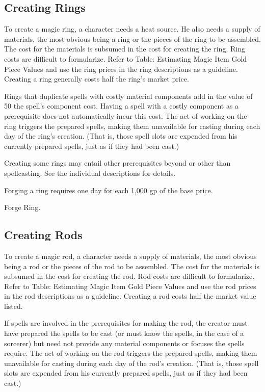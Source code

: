 \subsection{Creating Rings}

To create a magic ring, a character needs a heat source. He also needs a supply of materials, the most obvious being a ring or the pieces of the ring to be assembled. The cost for the materials is subsumed in the cost for creating the ring. Ring costs are difficult to formularize. Refer to Table: Estimating Magic Item Gold Piece Values and use the ring prices in the ring descriptions as a guideline. Creating a ring generally costs half the ring's market price.

Rings that duplicate spells with costly material components add in the value of 50 \x the spell's component cost. Having a spell with a costly component as a prerequisite does not automatically incur this cost. The act of working on the ring triggers the prepared spells, making them unavailable for casting during each day of the ring's creation. (That is, those spell slots are expended from his currently prepared spells, just as if they had been cast.)

Creating some rings may entail other prerequisites beyond or other than spellcasting. See the individual descriptions for details.

Forging a ring requires one day for each 1,000 gp of the base price.

 Forge Ring.

\subsection{Creating Rods}

To create a magic rod, a character needs a supply of materials, the most obvious being a rod or the pieces of the rod to be assembled. The cost for the materials is subsumed in the cost for creating the rod. Rod costs are difficult to formularize. Refer to Table: Estimating Magic Item Gold Piece Values and use the rod prices in the rod descriptions as a guideline. Creating a rod costs half the market value listed.

If spells are involved in the prerequisites for making the rod, the creator must have prepared the spells to be cast (or must know the spells, in the case of a sorcerer) but need not provide any material components or focuses the spells require. The act of working on the rod triggers the prepared spells, making them unavailable for casting during each day of the rod's creation. (That is, those spell slots are expended from his currently prepared spells, just as if they had been cast.)

